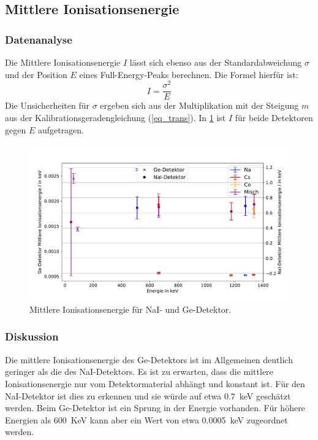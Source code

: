 \documentclass[
	a4paper,
	12pt,
	pagesize,
	ngerman
]{scrartcl}
\begin{document}
\subsection{Mittlere Ionisationsenergie}
\subsubsection{Datenanalyse}
Die Mittlere Ionisationsenergie $I$ lässt sich ebenso aus der Standardabweichung $\sigma$ und der Position $E$ eines Full-Energy-Peaks berechnen.
Die Formel hierfür ist:
\begin{equation}
	I = \frac{\sigma^2}{E}
\end{equation}
Die Unsicherheiten für $\sigma$ ergeben sich aus der Multiplikation mit der Steigung $m$ aus der Kalibrationsgeradengleichung (\ref{eq_trans}).
In \cref{fg_ionisation} ist $I$ für beide Detektoren gegen $E$ aufgetragen.


	\begin{figure}[H]
			\includegraphics[width= 1 \linewidth]{img/ion}
			\caption{
			Mittlere Ionisationsenergie für NaI- und Ge-Detektor.
			}
			\label{fg_ionisation}
	\end{figure}

\subsubsection{Diskussion}

Die mittlere Ionisationsenergie des Ge-Detektors ist im Allgemeinen deutlich geringer als die des NaI-Detektors.
Es ist zu erwarten, dass die mittlere Ionisationsenergie nur vom Detektormaterial abhängt und konstant ist.
Für den NaI-Detektor ist dies zu erkennen und sie würde auf etwa \SI{0,7}{keV} geschätzt werden.
Beim Ge-Detektor ist ein Sprung in der Energie vorhanden.
Für höhere Energien als \SI{600}{KeV} kann aber ein Wert von etwa \SI{0,0005}{keV} zugeordnet werden.
\end{document}
